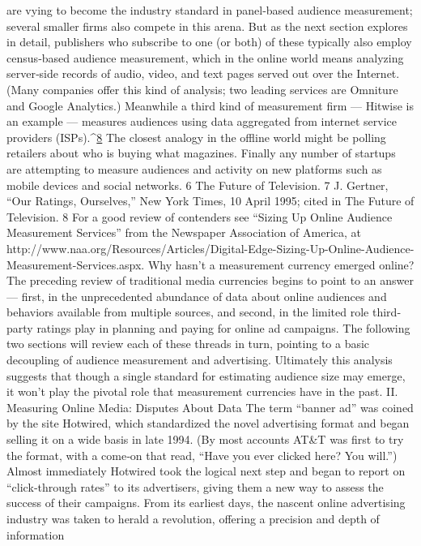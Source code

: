are vying to become the industry standard in panel‐based audience
measurement; several smaller firms also compete in this arena. But as the
next section explores in detail, publishers who subscribe to one (or both)
of these typically also employ census‐based audience measurement,
which in the online world means analyzing server‐side records of audio,
video, and text pages served out over the Internet. (Many companies offer
this kind of analysis; two leading services are Omniture and Google
Analytics.) Meanwhile a third kind of measurement firm — Hitwise is an
example — measures audiences using data aggregated from internet
service providers (ISPs).^{\href{#endnotes}{8}} The closest analogy in the offline world might be
polling retailers about who is buying what magazines. Finally any number
of startups are attempting to measure audiences and activity on new
platforms such as mobile devices and social networks.
6 The Future of Television.
7 J. Gertner, ``Our Ratings, Ourselves,'' New York Times, 10 April 1995; cited in The
Future of Television.
8 For a good review of contenders see ``Sizing Up Online Audience Measurement
Services'' from the Newspaper Association of America, at
http://www.naa.org/Resources/Articles/Digital-Edge-Sizing-Up-Online-Audience-
Measurement-Services.aspx.
Why hasn’t a measurement currency emerged online? The preceding
review of traditional media currencies begins to point to an answer —
first, in the unprecedented abundance of data about online audiences and
behaviors available from multiple sources, and second, in the limited role
third‐party ratings play in planning and paying for online ad campaigns.
The following two sections will review each of these threads in turn,
pointing to a basic decoupling of audience measurement and advertising.
Ultimately this analysis suggests that though a single standard for
estimating audience size may emerge, it won’t play the pivotal role that
measurement currencies have in the past.
II. Measuring Online Media: Disputes About Data
The term ``banner ad'' was coined by the site Hotwired, which
standardized the novel advertising format and began selling it on a wide
basis in late 1994. (By most accounts AT&T was first to try the format,
with a come‐on that read, ``Have you ever clicked here? You will.'')
Almost immediately Hotwired took the logical next step and began to
report on ``click‐through rates'' to its advertisers, giving them a new way
to assess the success of their campaigns.
From its earliest days, the nascent online advertising industry was taken
to herald a revolution, offering a precision and depth of information

